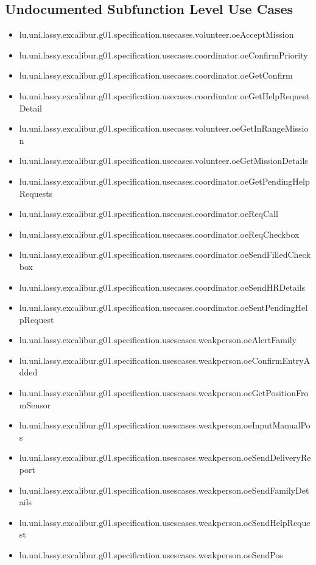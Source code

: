 \subsection[Undocumented Use Cases - Subfunction Level]{Undocumented Subfunction Level Use Cases}
\begin{itemize}
\item lu.uni.lassy.excalibur.g01.specification.usecases.volunteer.oeAcceptMission 
\item lu.uni.lassy.excalibur.g01.specification.usecases.coordinator.oeConfirmPriority 
\item lu.uni.lassy.excalibur.g01.specification.usecases.coordinator.oeGetConfirm 
\item lu.uni.lassy.excalibur.g01.specification.usecases.coordinator.oeGetHelpRequestDetail 
\item lu.uni.lassy.excalibur.g01.specification.usecases.volunteer.oeGetInRangeMission 
\item lu.uni.lassy.excalibur.g01.specification.usecases.volunteer.oeGetMissionDetails 
\item lu.uni.lassy.excalibur.g01.specification.usecases.coordinator.oeGetPendingHelpRequests 
\item lu.uni.lassy.excalibur.g01.specification.usecases.coordinator.oeReqCall 
\item lu.uni.lassy.excalibur.g01.specification.usecases.coordinator.oeReqCheckbox 
\item lu.uni.lassy.excalibur.g01.specification.usecases.coordinator.oeSendFilledCheckbox 
\item lu.uni.lassy.excalibur.g01.specification.usecases.coordinator.oeSendHRDetails 
\item lu.uni.lassy.excalibur.g01.specification.usecases.coordinator.oeSentPendingHelpRequest 
\item lu.uni.lassy.excalibur.g01.specification.usescases.weakperson.oeAlertFamily 
\item lu.uni.lassy.excalibur.g01.specification.usescases.weakperson.oeConfirmEntryAdded 
\item lu.uni.lassy.excalibur.g01.specification.usescases.weakperson.oeGetPositionFromSensor 
\item lu.uni.lassy.excalibur.g01.specification.usescases.weakperson.oeInputManualPos 
\item lu.uni.lassy.excalibur.g01.specification.usescases.weakperson.oeSendDeliveryReport 
\item lu.uni.lassy.excalibur.g01.specification.usescases.weakperson.oeSendFamilyDetails 
\item lu.uni.lassy.excalibur.g01.specification.usescases.weakperson.oeSendHelpRequest 
\item lu.uni.lassy.excalibur.g01.specification.usescases.weakperson.oeSendPos 
\end{itemize}






